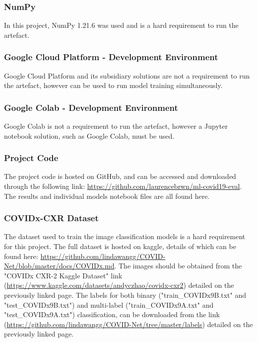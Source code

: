 \subsubsection{NumPy}
In this project, NumPy 1.21.6 was used and is a hard requirement to run the artefact.

\subsubsection{Google Cloud Platform - Development Environment}
Google Cloud Platform and its subsidiary solutions are not a requirement to run the artefact, however can be used to run model training simultaneously.

\subsubsection{Google Colab - Development Environment}
Google Colab is not a requirement to run the artefact, however a Jupyter notebook solution, such as Google Colab, must be used.

\subsubsection{Project Code}
The project code is hosted on GitHub, and can be accessed and downloaded through the following link: \url{https://github.com/laurencebrwn/ml-covid19-eval}. The results and individual models notebook files are all found here.

\subsubsection{COVIDx-CXR Dataset}
The dataset used to train the image classification models is a hard requirement for this project. The full dataset is hosted on kaggle, details of which can be found here: \url{https://github.com/lindawangg/COVID-Net/blob/master/docs/COVIDx.md}. The images should be obtained from the "COVIDx CXR-2 Kaggle Dataset" link (\url{https://www.kaggle.com/datasets/andyczhao/covidx-cxr2}) detailed on the previously linked page. The labels for both binary ("train\_COVIDx9B.txt" and "test\_COVIDx9B.txt") and multi-label ("train\_COVIDx9A.txt" and "test\_COVIDx9A.txt") classification, can be downloaded from the link (\url{https://github.com/lindawangg/COVID-Net/tree/master/labels}) detailed on the previously linked page.


